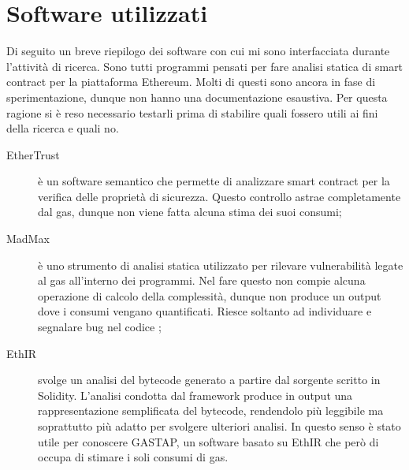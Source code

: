 \documentclass[a4paper,10pt]{article}
\begin{document}
\section{Software utilizzati}
Di seguito un breve riepilogo dei software con cui mi sono interfacciata durante l'attività di ricerca.\newline
Sono tutti programmi pensati per fare analisi statica di smart contract per la piattaforma Ethereum. Molti di questi sono ancora in fase di sperimentazione, dunque non hanno una documentazione esaustiva. Per questa ragione si è reso necessario testarli prima di stabilire quali fossero utili ai fini della ricerca e quali no.\newline
\newline
\begin{description} %
  \item[EtherTrust] è un software semantico che permette di analizzare smart contract per la verifica delle proprietà di sicurezza. Questo controllo astrae completamente dal gas, dunque non viene fatta alcuna stima dei suoi consumi;
  \item[MadMax] è uno strumento di analisi statica utilizzato per rilevare vulnerabilità legate al gas all'interno dei programmi. Nel fare questo non compie alcuna operazione di calcolo della complessità, dunque non produce un output dove i consumi vengano quantificati. Riesce soltanto ad individuare e segnalare bug nel codice ;
  \item[EthIR] svolge un analisi del bytecode generato a partire dal sorgente scritto in Solidity. L'analisi condotta dal framework produce in output una rappresentazione semplificata del bytecode, rendendolo più leggibile ma soprattutto più adatto per svolgere ulteriori analisi. In questo senso è stato utile per conoscere GASTAP, un software basato su EthIR che però di occupa di stimare i soli consumi di gas.
\end{description}
\end{document}
